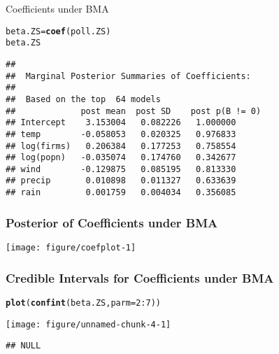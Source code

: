 \documentclass[handout]{beamer}\usepackage[]{graphicx}\usepackage[]{color}
\makeatletter
\def\maxwidth{ %
  \ifdim\Gin@nat@width>\linewidth
    \linewidth
  \else
    \Gin@nat@width
  \fi
}
\newcommand{\hlnum}[1]{\textcolor[rgb]{0.686,0.059,0.569}{#1}}%
\newcommand{\hlopt}[1]{\textcolor[rgb]{0,0,0}{#1}}%
\newcommand{\hlstd}[1]{\textcolor[rgb]{0.345,0.345,0.345}{#1}}%
\newcommand{\hlkwb}[1]{\textcolor[rgb]{0.69,0.353,0.396}{#1}}%
\newcommand{\hlkwc}[1]{\textcolor[rgb]{0.333,0.667,0.333}{#1}}%
\newcommand{\hlkwd}[1]{\textcolor[rgb]{0.737,0.353,0.396}{\textbf{#1}}}%
\newenvironment{kframe}{%
 \def\at@end@of@kframe{}%
 \ifinner\ifhmode%
  \def\at@end@of@kframe{\end{minipage}}%
  \begin{minipage}{\columnwidth}%
 \fi\fi%
 \def\FrameCommand##1{\hskip\@totalleftmargin \hskip-\fboxsep
 \colorbox{shadecolor}{##1}\hskip-\fboxsep
     \hskip-\linewidth \hskip-\@totalleftmargin \hskip\columnwidth}%
 \MakeFramed {\advance\hsize-\width
   \@totalleftmargin\z@ \linewidth\hsize
   \@setminipage}}%
 {\par\unskip\endMakeFramed%
 \at@end@of@kframe}
\newenvironment{knitrout}{}{} %
\makeatother
\begin{document}
\begin{frame}[fragile] {Coefficients under BMA}
\begin{knitrout}
\color{fgcolor}\begin{kframe}
\begin{alltt}
\hlstd{beta.ZS} \hlkwb{=} \hlkwd{coef}\hlstd{(poll.ZS)}
\hlstd{beta.ZS}
\end{alltt}
\begin{verbatim}
## 
##  Marginal Posterior Summaries of Coefficients: 
## 
##  Based on the top  64 models 
##             post mean  post SD    post p(B != 0)
## Intercept    3.153004   0.082226   1.000000     
## temp        -0.058053   0.020325   0.976833     
## log(firms)   0.206384   0.177253   0.758554     
## log(popn)   -0.035074   0.174760   0.342677     
## wind        -0.129875   0.085195   0.813330     
## precip       0.010898   0.011327   0.633639     
## rain         0.001759   0.004034   0.356085
\end{verbatim}
\end{kframe}
\end{knitrout}
\end{frame}

\begin{frame}[fragile] \frametitle{Posterior of Coefficients under BMA}
\begin{knitrout}
\color{fgcolor}

{\centering \texttt{[image: figure/coefplot-1]} 

}



\end{knitrout}
\end{frame}

\begin{frame}[fragile] \frametitle{Credible Intervals for Coefficients under BMA}
\begin{knitrout}
\color{fgcolor}\begin{kframe}
\begin{alltt}
\hlkwd{plot}\hlstd{(}\hlkwd{confint}\hlstd{(beta.ZS,} \hlkwc{parm}\hlstd{=}\hlnum{2}\hlopt{:}\hlnum{7}\hlstd{))}
\end{alltt}
\end{kframe}

{\centering \texttt{[image: figure/unnamed-chunk-4-1]} 

}


\begin{kframe}\begin{verbatim}
## NULL
\end{verbatim}
\end{kframe}
\end{knitrout}
\end{frame}
\end{document}
